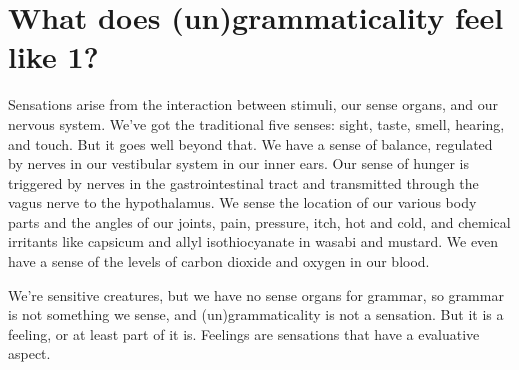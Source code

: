 



\section{What does (un)grammaticality feel like 1?}

Sensations arise from the interaction between stimuli, our sense organs, and our nervous system. We've got the traditional five senses: sight, taste, smell, hearing, and touch. But it goes well beyond that. We have a sense of balance, regulated by nerves in our vestibular system in our inner ears. Our sense of hunger is triggered by nerves in the gastrointestinal tract and transmitted through the vagus nerve to the hypothalamus. We sense the location of our various body parts and the angles of our joints, pain, pressure, itch, hot and cold, and chemical irritants like capsicum and allyl isothiocyanate in wasabi and mustard. We even have a sense of the levels of carbon dioxide and oxygen in our blood.

We're sensitive creatures, but we have no sense organs for grammar, so grammar is not something we sense, and (un)grammaticality is not a sensation. But it is a feeling, or at least part of it is. Feelings are sensations that have a evaluative aspect.


